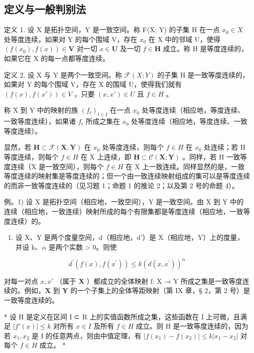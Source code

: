 \subsection{定义与一般判别法}

定义 1. 设 X 是拓扑空间，Y 是一致空间。称 F(X; Y) 的子集 H 在一点 \(x_{0} \in X\) 处等度连续，如果对 Y 的每个围域 V，存在 \(x_{0}\) 在 X 中的邻域 U，使得 \((f(x_{0}),f(x))\in\mathbf{V}\) 对一切 \(x\in\mathbf{U}\) 及一切 \(f\in\mathbf{H}\) 成立。称 H 是等度连续的，如果它在 X 的每一点都等度连续。

定义 2. 设 X 与 Y 是两个一致空间。称 \(\mathcal{F}(X;Y)\) 的子集 H 是一致等度连续的，如果对 Y 的每个围域 V，存在 X 的围域 U，使得我们就有 \((f(x), f(x')) \in V\) ，只要 \((x, x') \in U\) 且 \(f \in H\) 。

称 X 到 Y 中的映射的族 \((f_{t})_{t\in I}\) 在一点 \(x_0\) 处等度连续（相应地，等度连续、一致等度连续），如果诸 \(f_{t}\) 所成之集在 \(x_0\) 处等度连续（相应地，等度连续、一致等度连续）。

显然，若 \(\mathbf{H}\subset\mathcal{F}(\mathbf{X};\mathbf{Y})\) 在 \(x_{0}\) 处等度连续，则每个 \(f\in H\) 在 \(x_{0}\) 处连续；若 H 等度连续，则每个 \(f\in H\) 在 X 上连续，即 \(\mathbf{H}\subset\mathcal{C}(\mathbf{X};\mathbf{Y})\) 。同样，若 H 一致等度连续（X 是一致空间），则每个 \(f\in H\) 在 X 上一致连续。同样显然的是，一致等度连续的映射集是等度连续的；但一个由一致连续映射组成的集可以是等度连续的而非一致等度连续的（见习题 1；命题 1 的推论 2；以及第 2 号的命题 4）。

例。1) 设 X 是拓扑空间（相应地，一致空间），Y 是一致空间。由 X 到 Y 中的连续（相应地，一致连续）映射所成的每个有限集都是等度连续（相应地，一致等度连续）的。

\begin{enumerate}
\def\labelenumi{\arabic{enumi})}
\setcounter{enumi}{1}
\tightlist
\item
  设 X、Y 是两个度量空间，d（相应地，d'）是 X（相应地，Y）上的度量，并设 k、\(\alpha\) 是两个实数 \textgreater{} 0。则使
\end{enumerate}

\[
d ^ {\prime} (f (x), f (x ^ {\prime})) \leqslant k (d (x, x ^ {\prime})) ^ {\alpha}
\]

对每一对点 \(x, x'\) （属于 \(\mathbf{X}\) ）都成立的全体映射 f: X → Y 所成之集是一致等度连续的。例如，\(\mathbf{X}\) 到 \(\mathbf{Y}\) 的一个子集上的全体等距映射（第 IX 章，§ 2，第 2 号）是一致等度连续的。

* 设 H 是定义在区间 I ⊂ R 上的实值函数所成之集，这些函数在 I 上可微，且满足 \(|f'(x)| \leqslant k\) 对所有 \(x \in I\) 及所有 \(f \in H\) 成立。则 H 是一致等度连续的，因为若 \(x_{1}, x_{2}\) 是 I 的任意两点，则由中值定理，有 \(|f(x_{1}) - f(x_{2})| \leqslant k |x_{1} - x_{2}|\) 对每个 \(f \in H\) 成立。 *


